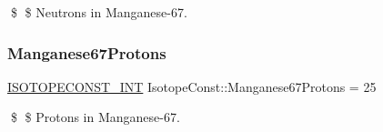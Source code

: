 \$ \$ Neutrons in Manganese-\/67. \mbox{\label{group___isotope_const-_manganese-_mn67_ga4d195bbfa3011e8237457aa5822ae17c}} 
\subsubsection{\texorpdfstring{Manganese67\+Protons}{Manganese67Protons}}
{\footnotesize\ttfamily \mbox{\hyperlink{group___isotope_const-_macros_ga5f18360b3e99483a35c32d789e62621c}{I\+S\+O\+T\+O\+P\+E\+C\+O\+N\+S\+T\+\_\+\+I\+NT}} Isotope\+Const\+::\+Manganese67\+Protons = 25}

\$ \$ Protons in Manganese-\/67. 